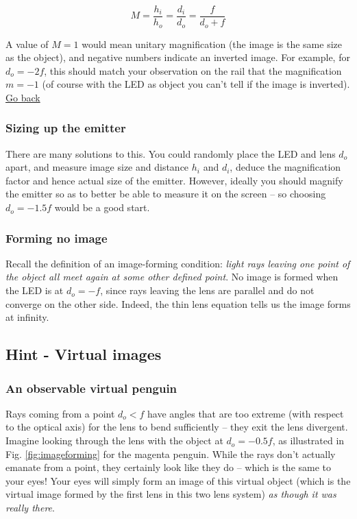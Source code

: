 \documentclass[a4paper]{report}
\begin{document}
	\begin{equation}
	M = \frac{h_i}{h_o} = \frac{d_i}{d_o} = \frac{f}{d_o+f}
	\label{eq:mag}
	\end{equation}
	
	A value of $M=1$ would mean unitary magnification (the image is the same size as the object), and negative numbers indicate an inverted image. For example, for $d_o=-2f$, this should match your observation on the rail that the magnification $m=-1$ (of course with the LED as object you can't tell if the image is inverted).
	\\
	\hyperlink{hintBack-image}{Go back}
	
	\subsubsection{Sizing up the emitter}
	There are many solutions to this. You could randomly place the LED and lens $d_o$ apart, and measure image size and distance $h_i$ and $d_i$, deduce the magnification factor and hence actual size of the emitter. However, ideally you should magnify the emitter so as to better be able to measure it on the screen -- so choosing $d_o=-1.5f$ would be a good start.


	
	\subsubsection{Forming no image}
	Recall the definition of an image-forming condition: \emph{light rays leaving one point of the object all meet again at some other defined point}. No image is formed when the LED is at $d_o=-f$, since rays leaving the lens are parallel and do not converge on the other side. Indeed, the thin lens equation tells us the image forms at infinity.


	\clearpage
	
    \subsection{Hint - Virtual images}
	\hypertarget{hintTo-virtual}{}
	
	\subsubsection{An observable virtual penguin}
	Rays coming from a point $d_o<f$ have angles that are too extreme (with respect to the optical axis) for the lens to bend sufficiently -- they exit the lens divergent. Imagine looking through the lens with the object at $d_o=-0.5f$, as illustrated in Fig. \ref{fig:imageforming} for the magenta penguin. While the rays don't actually emanate from a point, they certainly look like they do -- which is the same to your eyes! Your eyes will simply form an image of this virtual object (which is the virtual image formed by the first lens in this two lens system) \emph{as though it was really there}. 
\end{document}
